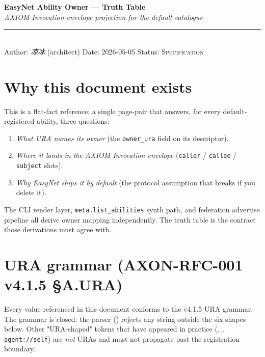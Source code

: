 \documentclass[10pt,a4paper]{article}
\newcommand{\code}[1]{\texttt{\small #1}}
\begin{document}
\begin{center}
  {\LARGE\bfseries EasyNet Ability Owner --- Truth Table}\\[0.4em]
  {\large\textit{AXIOM Invocation envelope projection for the default catalogue}}\\[0.3em]
  \rule{0.55\textwidth}{0.4pt}\\[0.4em]
  {\small Author: \emph{凉冰} (architect) \quad Date: 2026-05-05 \quad Status: \textsc{Specification}}\\[0.2em]
\end{center}

\vspace{0.5em}

\section*{Why this document exists}

This is a flat-fact reference: a single page-pair that answers, for every
default-registered ability, three questions:

\begin{enumerate}[leftmargin=1.6em,itemsep=0.1em,topsep=0.1em]
  \item \emph{What URA names its owner} (the \code{owner\_ura}
        field on its descriptor).
  \item \emph{Where it lands in the AXIOM Invocation envelope}
        (\code{caller} / \code{callee} / \code{subject} slots).
  \item \emph{Why EasyNet ships it by default} (the protocol assumption
        that breaks if you delete it).
\end{enumerate}

The CLI render layer, \code{meta.list\_abilities} synth path, and
federation advertise pipeline all derive owner mapping independently.
The truth table is the contract those derivations must agree with.

\section{URA grammar (AXON-RFC-001 v4.1.5 §A.URA)}

Every value referenced in this document conforms to the v4.1.5 URA
grammar. The grammar is closed: the parser
() rejects any string outside the six
shapes below. Other "URA-shaped" tokens that have appeared in practice
(, , \code{agent://self}) are
\emph{not} URAs and must not propagate past the registration boundary.
\end{document}
